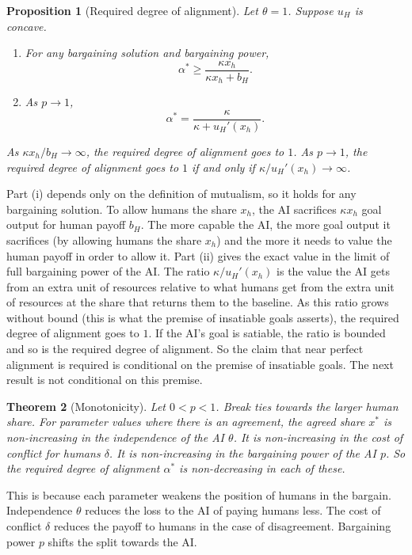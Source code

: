 \documentclass[article, 11pt, reqno]{amsart}
\newtheorem{theorem}{Theorem}
\newtheorem{proposition}[theorem]{Proposition}
\theoremstyle{named}
\newcommand{\bH}{b_H}
\theoremstyle{plain}
\begin{document}
\begin{proposition}[Required degree of alignment]\label{prop:alphastar}
Let $\theta = 1$. Suppose $u_H$ is concave.
\begin{enumerate}
\item[(i)] For any bargaining solution and bargaining power,
\[
\alpha^* \ge \frac{\kappa x_h}{\kappa x_h + \bH}.
\]
\item[(ii)] As $p \to 1$,
\[
\alpha^* = \frac{\kappa}{\kappa + u_H'(x_h)}.
\]
\end{enumerate}
As $\kappa x_h/\bH \to \infty$, the required degree of alignment goes to $1$. As $p \to 1$, the required degree of alignment goes to $1$ if and only if $\kappa / u_H'(x_h) \to \infty$.
\end{proposition}

Part (i) depends only on the definition of mutualism, so it holds for any bargaining solution. To allow humans the share $x_h$, the AI sacrifices $\kappa x_h$ goal output for human payoff $\bH$. The more capable the AI, the more goal output it sacrifices (by allowing humans the share $x_h$) and the more it needs to value the human payoff in order to allow it. Part (ii) gives the exact value in the limit of full bargaining power of the AI. The ratio $\kappa / u_H'(x_h)$ is the value the AI gets from an extra unit of resources relative to what humans get from the extra unit of resources at the share that returns them to the baseline. As this ratio grows without bound (this is what the premise of insatiable goals asserts), the required degree of alignment goes to $1$. If the AI's goal is satiable, the ratio is bounded and so is the required degree of alignment. So the claim that near perfect alignment is required is conditional on the premise of insatiable goals. The next result is not conditional on this premise.

\begin{theorem}[Monotonicity]\label{thm:monotone}
Let $0 < p < 1$. Break ties towards the larger human share. For parameter values where there is an agreement, the agreed share $x^*$ is non-increasing in the independence of the AI $\theta$. It is non-increasing in the cost of conflict for humans $\delta$. It is non-increasing in the bargaining power of the AI $p$. So the required degree of alignment $\alpha^*$ is non-decreasing in each of these.
\end{theorem}

This is because each parameter weakens the position of humans in the bargain. Independence $\theta$ reduces the loss to the AI of paying humans less. The cost of conflict $\delta$ reduces the payoff to humans in the case of disagreement. Bargaining power $p$ shifts the split towards the AI.
\end{document}
